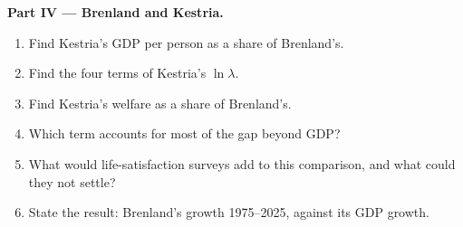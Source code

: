 \begin{problem}
\medskip\noindent\textbf{Part IV --- Brenland and Kestria.}
\begin{enumerate}[resume]
\item Find Kestria's GDP per person as a share of Brenland's.
\item Find the four terms of Kestria's $\ln\lambda$.
\item Find Kestria's welfare as a share of Brenland's.
\item Which term accounts for most of the gap beyond GDP?
\item What would life-satisfaction surveys add to this comparison, and what could
they not settle?
\item State the result: Brenland's  growth 1975--2025, against its GDP growth.
\end{enumerate}
\end{problem}
